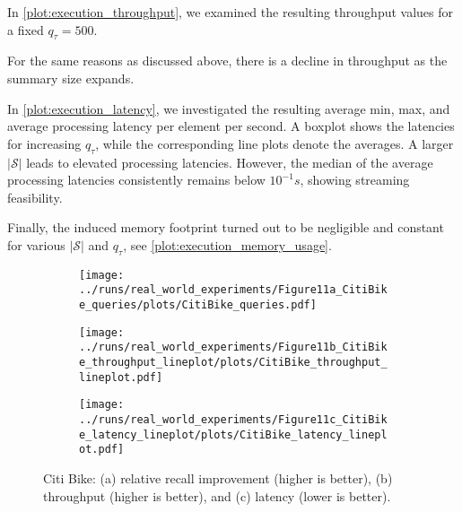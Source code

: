 In \autoref{plot:execution_throughput}, we examined the resulting throughput
values for a fixed $q_\tau = 500$.

For the same reasons as discussed above,
there is a decline in throughput as the summary size expands.


In \autoref{plot:execution_latency}, we investigated the resulting average
min, max, and average processing latency per element per second.
A boxplot shows the latencies for increasing $q_\tau$, while the
corresponding line plots denote the averages. A larger
$|\mathcal{S}|$ leads to
elevated processing latencies. However, the median of the
average processing latencies consistently remains below $10^{-1}s$, showing streaming feasibility.


Finally, the induced memory footprint turned out to be negligible and
constant for various $|\mathcal{S}|$ and $q_\tau$, see
\autoref{plot:execution_memory_usage}.

\begin{figure*}[t]
	\centering
	\begin{subfigure}{.32\linewidth}
		\centering
		\texttt{[image: ../runs/real\_world\_experiments/Figure11a\_CitiBike\_queries/plots/CitiBike\_queries.pdf]}
		\vspace{-18pt}
		\caption{}
		\label{plot:citi_bike_average_total_match_ratio}
	\end{subfigure}
	\hfill
	\begin{subfigure}{.32\linewidth}
		\centering
		\texttt{[image: ../runs/real\_world\_experiments/Figure11b\_CitiBike\_throughput\_lineplot/plots/CitiBike\_throughput\_lineplot.pdf]}
		\vspace{-18pt}
		\caption{}
		\label{plot:citi_bike_throughput}
	\end{subfigure}
	\hfill
	\begin{subfigure}{.32\linewidth}
		\centering
		\texttt{[image: ../runs/real\_world\_experiments/Figure11c\_CitiBike\_latency\_lineplot/plots/CitiBike\_latency\_lineplot.pdf]}
		\vspace{-18pt}
		\caption{}
		\label{plot:citi_bike_latency}
	\end{subfigure}
	\vspace{-1em}
	\caption{Citi Bike: (a) relative recall improvement (higher is better), (b) throughput (higher is better), and (c) latency (lower is better).}
	\label{fig:citi_bike}
	\vspace{-1em}
\end{figure*}


